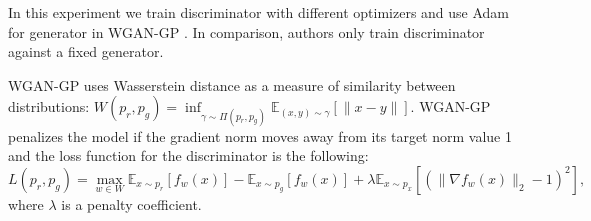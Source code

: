 \documentclass{article} %
\begin{document}
In this experiment we train discriminator with different
optimizers and use Adam for generator in WGAN-GP \citep{gulrajani2017improved}. In comparison,
authors only train discriminator against a fixed generator.

WGAN-GP uses Wasserstein distance as a measure of similarity between distributions: $W(p_r, p_g) = \inf_{\gamma \sim \Pi(p_r, p_g)} \mathbb{E}_{(x, y) \sim \gamma}[\| x-y \|]$. WGAN-GP penalizes the model if the gradient norm moves away from its target norm value 1 and the loss function for the discriminator is the following:
\begin{equation}\label{eq:wgan-gp}
L(p_r, p_g) = \max_{w \in W} \mathbb{E}_{x \sim p_r}[f_w(x)] - \mathbb{E}_{x \sim p_g}[f_w(x)] + \lambda \mathbb{E}_{x \sim p_x}[(\|\nabla f_w(x) \|_2 - 1)^2],
\end{equation}
where $\lambda$ is a penalty coefficient.
\end{document}
